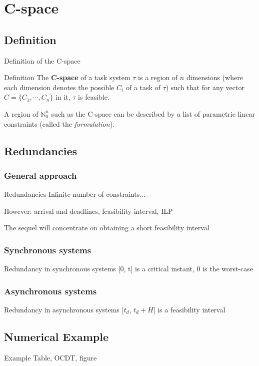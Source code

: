 \documentclass{beamer}
\begin{document}
\section{C-space}

	\subsection{Definition}

	\begin{frame}{Definition of the C-space}
		\begin{block}{Definition}
			The \textbf{C-space} of a task system $\tau$ is a region of $n$ dimensions (where each dimension denotes the possible $C_i$ of a task of $\tau$) such that for any vector $C = \{ C_1, \cdots, C_{n}\}$ in it, $\tau$ is feasible.
		\end{block}

		A region of $\mathbb{N}_0^n$ such as the C-space can be described by a list of parametric linear constraints (called the \emph{formulation}).
	\end{frame}

	\subsection{Redundancies}

		\subsubsection{General approach}

		\begin{frame}{Redundancies}
			Infinite number of constraints...

			However: arrival and deadlines, feasibility interval, ILP

			The sequel will concentrate on obtaining a short feasibility interval
		\end{frame}

		\subsubsection{Synchronous systems}

		\begin{frame}{Redundancy in synchronous systems}
			[0, t] is a critical instant, 0 is the worst-case
		\end{frame}

		\subsubsection{Asynchronous systems}

		\begin{frame}{Redundancy in asynchronous systems}
			[$t_d$, $t_d + H$] is a feasibility interval
		\end{frame}

	\subsection{Numerical Example}

	\begin{frame}{Example}
		Table, OCDT, figure
	\end{frame}
\end{document}

